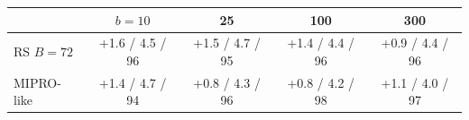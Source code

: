 \begin{tabular}{lcccc}
\toprule
 & $b{=}10$ & 25 & 100 & 300 \\
\midrule
RS $B{=}72$ & +1.6 / 4.5 / 96 & +1.5 / 4.7 / 95 & +1.4 / 4.4 / 96 & +0.9 / 4.4 / 96 \\
MIPRO-like & +1.4 / 4.7 / 94 & +0.8 / 4.3 / 96 & +0.8 / 4.2 / 98 & +1.1 / 4.0 / 97 \\
\bottomrule
\end{tabular}
